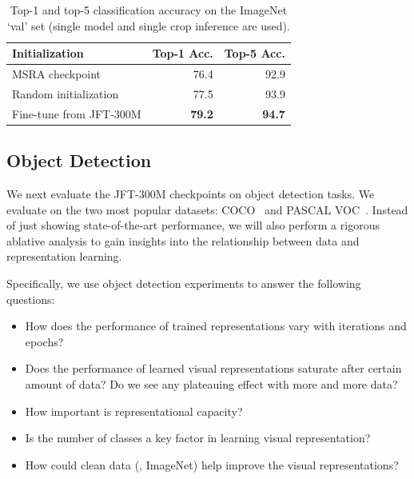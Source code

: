 \documentclass[10pt,twocolumn,letterpaper]{article}
\begin{document}
\begin{table}
\center
\begin{tabular}{l|r|r}
Initialization & Top-1 Acc. & Top-5 Acc. \\
\hline
MSRA checkpoint~\cite{he2016resnet} & 76.4 & 92.9 \\
Random initialization & 77.5 & 93.9 \\
Fine-tune from JFT-300M & \bf{79.2} & \bf{94.7} \\
\end{tabular}
\vspace{0.1in}
\caption{Top-1 and top-5 classification accuracy on the ImageNet `val' set (single model and single crop inference are used).}
\label{tab:imagenet_ft}
\end{table}

\subsection{Object Detection}
We next evaluate the JFT-300M checkpoints on object detection tasks. We evaluate on the two most popular datasets: COCO~\cite{COCO} and PASCAL VOC~\cite{Everingham10}. Instead of just showing state-of-the-art performance, we will also perform a rigorous ablative analysis to gain insights into the relationship between data and representation learning.

Specifically, we use object detection experiments to answer the following questions:
\begin{itemize}[noitemsep]
\item How does the performance of trained representations vary with iterations and epochs?
\item Does the performance of learned visual representations saturate after certain amount of data? Do we see any plateauing effect with more and more data?
\item How important is representational capacity?
\item Is the number of classes a key factor in learning visual representation?
\item How could clean data (\eg, ImageNet) help improve the visual representations?
\end{itemize} 
\end{document}
